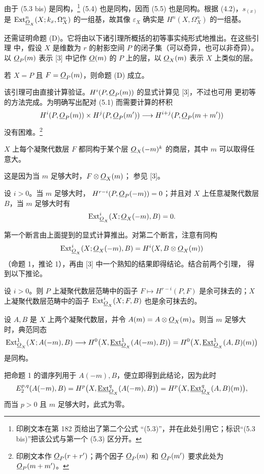 由于 (5.3 bis) 是同构，\footnote{印刷文本在第 182 页给出了第二个公式
“(5.3)”，并在此处引用它；标识“(5.3 bis)”把该公式与第一个 (5.3) 区分开。}
(5.4) 也是同构，因而 (5.5) 也是同构。根据 (4.2)，$s_{(x)}$ 是
$\operatorname{Ext}_{\underline{O}_X}^{n}(X;k_x,\Omega_X^{n})$ 的一组基，故其像
$\varepsilon_X$ 确实是 $H^{n}(X,\Omega_X^{n})$ 的一组基。

还需证明命题 (D)。它将由以下诸引理所概括的初等事实纯形式地推出。在这些引理
中，假设 $X$ 是维数为 $r$ 的射影空间 $P$ 的闭子集（可以奇异，也可以非奇异）。
以 $\underline{O}_P(m)$ 表示 [3] 中记作 $\underline{O}(m)$ 的 $P$ 上的层，以 $\underline{O}_X(m)$
表示 $X$ 上类似的层。

 若 $X=P$ 且 $F=\underline{O}_P(m)$，则命题 (D) 成立。

该引理可由直接计算验证。$H^{i}(P,\underline{O}_P(m))$ 的显式计算见 [3]，不过也可用
更初等的方法完成。为明确写出配对 (5.1) 而需要计算的杯积
\[
  H^{i}(P,\underline{O}_P(m))\times H^{j}(P,\underline{O}_P(m'))
  \longrightarrow H^{i+j}(P,\underline{O}_P(m+m'))
\]
没有困难。\footnote{印刷文本作 $\underline{O}_P(r+r')$；两个因子 $\underline{O}_P(m)$ 和
$\underline{O}_P(m')$ 要求此处为 $\underline{O}_P(m+m')$。}

 $X$ 上每个凝聚代数层 $F$ 都同构于某个层
$\underline{O}_X(-m)^{k}$ 的商层，其中 $m$ 可以取得任意大。

这是因为当 $m$ 足够大时，$F\otimes\underline{O}_X(m)$；
参见 [3]。

 设 $i>0$。当 $m$ 足够大时，
$H^{r-i}(P,\underline{O}_P(-m))=0$；并且对 $X$ 上任意凝聚代数层 $B$，当 $m$
足够大时有
\[
  \operatorname{Ext}_{\underline{O}_X}^{i}(X;\underline{O}_X(-m),B)=0.
\]

第一个断言由上面提到的显式计算推出。对第二个断言，注意有同构
\[
  \operatorname{Ext}_{\underline{O}_X}^{i}(X;\underline{O}_X(-m),B)
  =H^{i}(X,B\otimes\underline{O}_X(m))
\]
（命题 1，推论 1），再由 [3] 中一个熟知的结果即得结论。结合前两个引理，
得到以下推论。

 设 $i>0$。则 $P$ 上凝聚代数层范畴中的函子
$F\longmapsto H^{r-i}(P,F)$ 是余可抹去的；$X$ 上凝聚代数层范畴中的函子
$\operatorname{Ext}_{\underline{O}_X}^{i}(X;F,B)$ 也是余可抹去的。

 设 $A,B$ 是 $X$ 上两个凝聚代数层，并令
$A(m)=A\otimes\underline{O}_X(m)$。则当 $m$ 足够大时，典范同态
\[
  \operatorname{Ext}_{\underline{O}_X}^{1}(X;A(-m),B)
  \longrightarrow H^{0}\bigl(X,\underline{\operatorname{Ext}}_{\underline{O}_X}^{1}(A(-m),B)\bigr)
  =H^{0}\bigl(X,\underline{\operatorname{Ext}}_{\underline{O}_X}^{1}(A,B)(m)\bigr)
\]
是同构。

把命题 1 的谱序列用于 $A(-m),B$，便立即得到此结论，因为此时
\[
  E_{2}^{p,q}(A(-m),B)
  =H^{p}\bigl(X,\underline{\operatorname{Ext}}_{\underline{O}_X}^{q}(A(-m),B)\bigr)
  =H^{p}\bigl(X,\underline{\operatorname{Ext}}_{\underline{O}_X}^{q}(A,B)(m)\bigr),
\]
而当 $p>0$ 且 $m$ 足够大时，此式为零。

